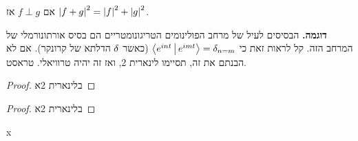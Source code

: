 \documentclass[]{../../../../tex/classes/styledArticle}
\begin{document}
	\begin{Collary}[פיתגורס]
		אם $f \perp g$ אז $\left \lvert f + g \right \rvert^{2} = \left \lvert f \right \rvert^{2} + \left \lvert g \right \rvert^{2}$. 
	\end{Collary}
	\textbf{דוגמה. }הבסיסים לעיל של מרחב הפולינומים הטריגונומטריים הם בסיס אורתונורמלי של המרחב הזה. קל לראות זאת כי $\left \langle e^{int} \,\middle|\, e^{imt} \right \rangle = \delta_{n = m}$ (כאשר $\delta$ הדלתא של קרונקר). אם לא הבנתם את זה, תסיימו לינארית 2, ואז זה יהיה טרוויאלי. טראסט. 
	
	\begin{proof}
		בלינארית 2א
	\end{proof}
	\begin{proof}
		בלינארית 2א
	\end{proof}
	x
	
	
	\ndoc
\end{document}
